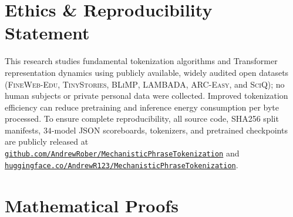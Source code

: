 \documentclass[11pt,a4paper]{article}
\newif\ifanonymous
\begin{document}
\section*{Ethics \& Reproducibility Statement}
This research studies fundamental tokenization algorithms and Transformer representation dynamics using publicly available, widely audited open datasets (\textsc{FineWeb-Edu}, \textsc{TinyStories}, \textsc{BLiMP}, \textsc{LAMBADA}, \textsc{ARC-Easy}, and \textsc{SciQ}); no human subjects or private personal data were collected. Improved tokenization efficiency can reduce pretraining and inference energy consumption per byte processed. \ifanonymous To ensure complete reproducibility, all source code (\texttt{src/}), end-to-end training and evaluation orchestrators (\texttt{scripts/}), SHA256 dataset split manifests, exact $34$-model JSON scoreboards, and figure generation scripts are included in the anonymized supplementary archive.\else To ensure complete reproducibility, all source code, SHA256 split manifests, $34$-model JSON scoreboards, tokenizers, and pretrained checkpoints are publicly released at \href{https://github.com/AndrewRober/MechanisticPhraseTokenization}{\texttt{github.com/AndrewRober/MechanisticPhraseTokenization}} and \href{https://huggingface.co/AndrewR123/MechanisticPhraseTokenization}{\texttt{huggingface.co/AndrewR123/MechanisticPhraseTokenization}}.\fi




\newpage
\appendix

\section{Mathematical Proofs}
\label{app:proofs}
\end{document}
